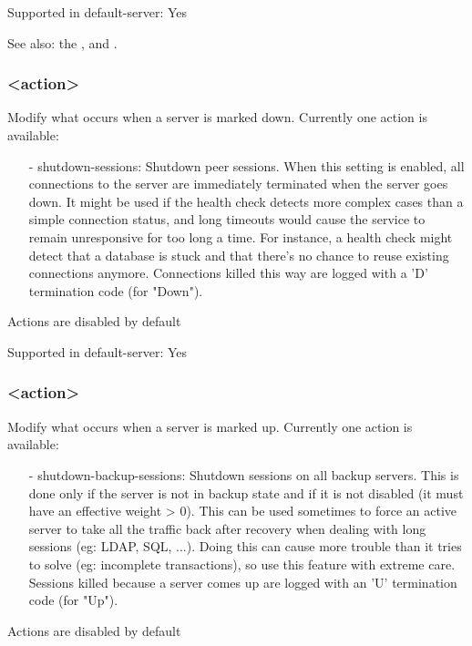   Supported in default-server: Yes


See also: the ,  and .

\subsubsection[on-marked-down]{ <action>}
  Modify what occurs when a server is marked down.
  Currently one action is available:
  \begin{itemize}
  \item[-] shutdown-sessions: Shutdown peer sessions. When this setting is enabled,
    all connections to the server are immediately terminated when the server
    goes down. It might be used if the health check detects more complex cases
    than a simple connection status, and long timeouts would cause the service
    to remain unresponsive for too long a time. For instance, a health check
    might detect that a database is stuck and that there's no chance to reuse
    existing connections anymore. Connections killed this way are logged with
    a 'D' termination code (for "Down").
  \end{itemize}

  Actions are disabled by default

  Supported in default-server: Yes

\subsubsection[on-marked-up]{ <action>}
  Modify what occurs when a server is marked up.
  Currently one action is available:
  \begin{itemize}
  \item[-] shutdown-backup-sessions: Shutdown sessions on all backup servers. This is
    done only if the server is not in backup state and if it is not disabled
    (it must have an effective weight > 0). This can be used sometimes to force
    an active server to take all the traffic back after recovery when dealing
    with long sessions (eg: LDAP, SQL, ...). Doing this can cause more trouble
    than it tries to solve (eg: incomplete transactions), so use this feature
    with extreme care. Sessions killed because a server comes up are logged
    with an 'U' termination code (for "Up").
  \end{itemize}

  Actions are disabled by default

